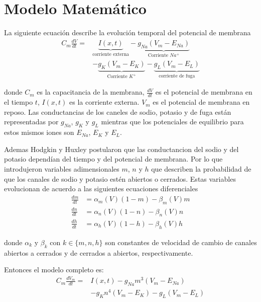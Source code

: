 \documentclass[aps,prl,reprint,groupedaddress]{revtex4-2}
\begin{document}
\section{Modelo Matemático}

La siguiente ecuación describe la evolución temporal del potencial de membrana
\begin{align*}
    C_m \frac{dV}{dt} = &\underbrace{I(x,t)}_{\text{corriente externa}} - \underbrace{g_{Na}(V_{m} - E_{Na})}_{\text{Corriente $Na^{+}$}}  \\
    &- \underbrace{g_{K}(V_{m} - E_{K})}_{\text{Corriente $K^{+}$}} - \underbrace{g_{L}(V_{m} - E_{L})}_{\text{corriente de fuga}}
\end{align*}

donde $C_{m}$ es la capacitancia de la membrana, $\frac{dV}{dt}$ es el potencial 
de membrana en el tiempo $t$, $I(x,t)$ es la corriente externa. $V_{m}$ es el
potencial de membrana en reposo. Las conductancias de los caneles de sodio, 
potasio y de fuga están representadas por $g_{Na}$, $g_{K}$ y $g_{L}$ mientras 
que los potenciales de equilibrio para estos mismos iones son $E_{Na}$, $E_{K}$ 
y $E_{L}$.

Ademas Hodgkin y Huxley postularon que las conductancion del sodio y del potasio 
dependían del tiempo y del potencial de membrana. Por lo que introdujeron variables 
adimensionales $m$, $n$ y $h$ que describen la probabilidad de que los canales de
sodio y potasio estén abiertos o cerrados. Estas variables evolucionan de acuerdo a
las siguientes ecuaciones diferenciales
\begin{align*}
    \frac{dm}{dt} &= \alpha_{m}(V)(1 - m) - \beta_{m}(V)m \\
    \frac{dn}{dt} &= \alpha_{n}(V)(1 - n) - \beta_{n}(V)n \\
    \frac{dh}{dt} &= \alpha_{h}(V)(1 - h) - \beta_{h}(V)h
\end{align*}

donde $\alpha_{k}$ y $\beta_{k}$ con $k \in \{m, n, h\}$ son constantes de velocidad 
de cambio de canales abiertos a cerrados y de cerrados a abiertos, respectivamente. 

Entonces el modelo completo es:
\begin{align*}
    C_{m} \frac{dV_{m}}{dt} = &I(x,t) - g_{Na}m^{3}(V_{m} - E_{Na})  \\
    &- g_{K}n^{4}(V_{m} - E_{K}) - g_{L}(V_{m} - E_{L}) \\
\end{align*}
\end{document}
